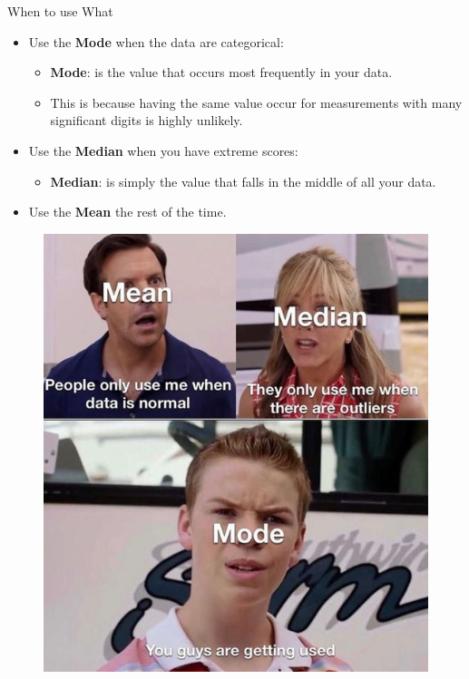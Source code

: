 \documentclass[
  ignorenonframetext,
]{beamer}
\providecommand{\tightlist}{%
  \setlength{\itemsep}{0pt}\setlength{\parskip}{0pt}}
\begin{document}
\begin{frame}{When to use What}
\label{when-to-use-what}
\small

\begin{itemize}
\tightlist
\item
  Use the \textbf{Mode} when the data are categorical:

  \begin{itemize}
  \tightlist
  \item
    \textbf{Mode}: is the value that occurs most frequently in your
    data.\\
  \item
    This is because having the same value occur for measurements with
    many significant digits is highly unlikely.
  \end{itemize}
\end{itemize}

\begin{itemize}
\tightlist
\item
  Use the \textbf{Median} when you have extreme scores:

  \begin{itemize}
  \tightlist
  \item
    \textbf{Median}: is simply the value that falls in the middle of all
    your data.
  \end{itemize}
\end{itemize}

\begin{itemize}
\tightlist
\item
  Use the \textbf{Mean} the rest of the time.\\
\end{itemize}

\begin{figure}
\includegraphics[width=0.25\linewidth]{fig/CnetralTendency} \end{figure}
\end{frame}
\end{document}
